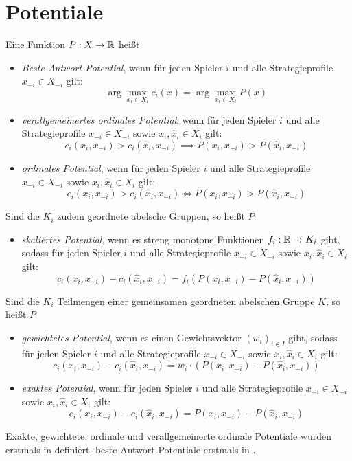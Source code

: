 \section{Potentiale}\label{sec:Potentiale}

\begin{defn}
	Eine Funktion $P: X \to \mathbb{R}$ heißt
	\begin{itemize}
		\item \emph{Beste Antwort-Potential}, wenn für jeden Spieler $i$ und alle Strategieprofile $x_{-i} \in X_{-i}$ gilt:
			\[\arg \max_{x_i \in X_i}c_i(x) = \arg \max_{x_i \in X_i} P(x)\]
		\item \emph{verallgemeinertes ordinales Potential}, wenn für jeden Spieler $i$ und alle Strategieprofile $x_{-i} \in X_{-i}$ sowie $x_i, \hat{x}_i \in X_i$ gilt:
			\[c_i(x_i,x_{-i}) > c_i(\hat{x}_i, x_{-i}) \implies P(x_i,x_{-i}) > P(\hat{x}_i, x_{-i})\]
		\item \emph{ordinales Potential}, wenn für jeden Spieler $i$ und alle Strategieprofile $x_{-i} \in X_{-i}$ sowie $x_i, \hat{x}_i \in X_i$ gilt:
			\[c_i(x_i,x_{-i}) > c_i(\hat{x}_i, x_{-i}) \iff P(x_i,x_{-i}) > P(\hat{x}_i, x_{-i})\]
	\end{itemize}
	Sind die $K_i$ zudem geordnete abelsche Gruppen, so heißt $P$
	\begin{itemize}
		\item \emph{skaliertes Potential}, wenn es streng monotone Funktionen $f_i: \mathbb{R} \to K_i$ gibt, sodass für jeden Spieler $i$ und alle Strategieprofile $x_{-i} \in X_{-i}$ sowie $x_i, \hat{x}_i \in X_i$ gilt:
			\[c_i(x_i,x_{-i}) - c_i(\hat{x}_i, x_{-i}) = f_i(P(x_i,x_{-i}) - P(\hat{x}_i, x_{-i}))\]
	\end{itemize}
	Sind die $K_i$ Teilmengen einer gemeinsamen geordneten abelschen Gruppe $K$, so heißt $P$
	\begin{itemize}	
		\item \emph{gewichtetes Potential}, wenn es einen Gewichtsvektor $(w_i)_{i\in I}$ gibt, sodass für jeden Spieler $i$ und alle Strategieprofile $x_{-i} \in X_{-i}$ sowie $x_i, \hat{x}_i \in X_i$ gilt:
			\[c_i(x_i,x_{-i}) - c_i(\hat{x}_i, x_{-i}) = w_i\cdot(P(x_i,x_{-i}) - P(\hat{x}_i, x_{-i}))\]
		\item \emph{exaktes Potential}, wenn für jeden Spieler $i$ und alle Strategieprofile $x_{-i} \in X_{-i}$ sowie $x_i, \hat{x}_i \in X_i$ gilt:
			\[c_i(x_i,x_{-i}) - c_i(\hat{x}_i, x_{-i}) = P(x_i,x_{-i}) - P(\hat{x}_i, x_{-i})\]
	\end{itemize}
\end{defn}

Exakte, gewichtete, ordinale und verallgemeinerte ordinale Potentiale wurden erstmals in \cite{MonShap} definiert, beste Antwort-Potentiale erstmals in \cite{BestRespPot}.